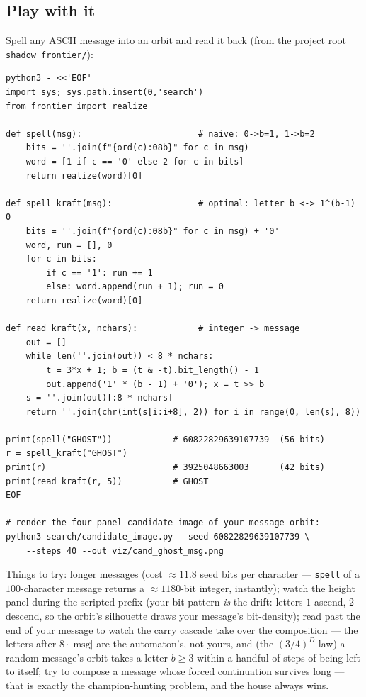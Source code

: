 \documentclass[10pt]{article}
\begin{document}
\subsection*{Play with it}
Spell any ASCII message into an orbit and read it back
(from the project root \texttt{shadow\_frontier/}):
\begin{verbatim}
python3 - <<'EOF'
import sys; sys.path.insert(0,'search')
from frontier import realize

def spell(msg):                       # naive: 0->b=1, 1->b=2
    bits = ''.join(f"{ord(c):08b}" for c in msg)
    word = [1 if c == '0' else 2 for c in bits]
    return realize(word)[0]

def spell_kraft(msg):                 # optimal: letter b <-> 1^(b-1) 0
    bits = ''.join(f"{ord(c):08b}" for c in msg) + '0'
    word, run = [], 0
    for c in bits:
        if c == '1': run += 1
        else: word.append(run + 1); run = 0
    return realize(word)[0]

def read_kraft(x, nchars):            # integer -> message
    out = []
    while len(''.join(out)) < 8 * nchars:
        t = 3*x + 1; b = (t & -t).bit_length() - 1
        out.append('1' * (b - 1) + '0'); x = t >> b
    s = ''.join(out)[:8 * nchars]
    return ''.join(chr(int(s[i:i+8], 2)) for i in range(0, len(s), 8))

print(spell("GHOST"))            # 60822829639107739  (56 bits)
r = spell_kraft("GHOST")
print(r)                         # 3925048663003      (42 bits)
print(read_kraft(r, 5))          # GHOST
EOF

# render the four-panel candidate image of your message-orbit:
python3 search/candidate_image.py --seed 60822829639107739 \
    --steps 40 --out viz/cand_ghost_msg.png
\end{verbatim}
Things to try: longer messages (cost $\approx11.8$ seed bits per
character --- \texttt{spell} of a $100$-character message returns a
$\approx1180$-bit integer, instantly); watch the height panel during
the scripted prefix (your bit pattern \emph{is} the drift: letters
$1$ ascend, $2$ descend, so the orbit's silhouette draws your
message's bit-density); read past the end of your message to watch
the carry cascade take over the composition --- the letters after
$8\cdot|\mathrm{msg}|$ are the automaton's, not yours, and (the
$(3/4)^D$ law) a random message's orbit takes a letter $b\ge3$ within
a handful of steps of being left to itself; try to compose a message
whose forced continuation survives long --- that is exactly the
champion-hunting problem, and the house always wins.
\end{document}
